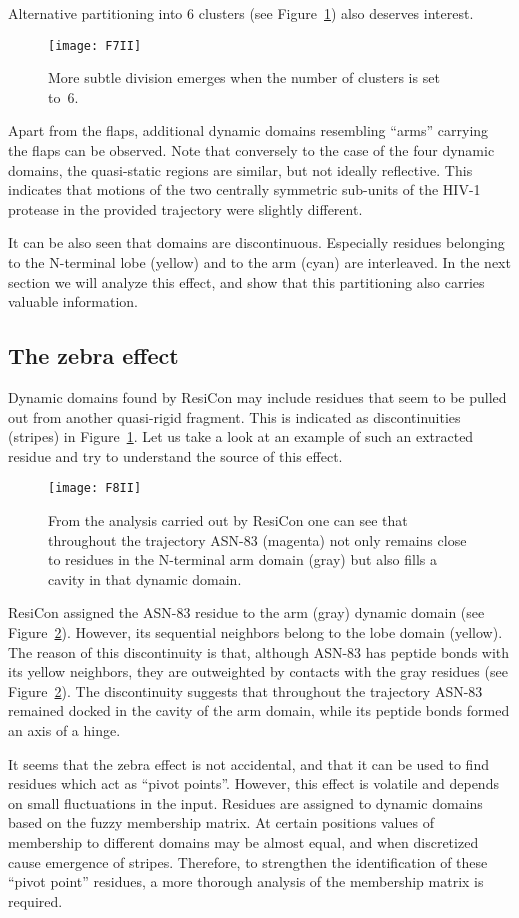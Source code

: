 \documentclass[a4paper,11pt,twoside]{book}%
\begin{document}
Alternative partitioning into 6 clusters (see Figure~\ref{6clusters}) also deserves interest.
\begin{figure}
\centering
\texttt{[image: F7II]}
\caption{
More subtle division emerges when the number of clusters is set to~6.
}
\label{6clusters}
\end{figure}
Apart from the flaps, additional dynamic domains resembling ``arms'' carrying the flaps can be observed.
Note that conversely to the case of the four dynamic domains, the quasi-static regions are similar, but not ideally reflective.
This indicates that motions of the two centrally symmetric sub-units of the HIV-1 protease in the provided trajectory were slightly different.

It can be also seen that domains are discontinuous.
Especially residues belonging to the N-terminal lobe (yellow) and to the arm (cyan) are interleaved.
In the next section we will analyze this effect, and show that this partitioning also carries valuable information.

\subsection*{The zebra effect}
Dynamic domains found by ResiCon may include residues that seem to be pulled out from another quasi-rigid fragment.
This is indicated as discontinuities (stripes) in Figure~\ref{6clusters}.
Let us take a look at an example of such an extracted residue and try to understand the source of this effect.
\begin{figure}
\centering
\texttt{[image: F8II]}
\caption{
From the analysis carried out by ResiCon one can see that throughout the trajectory ASN-83 (magenta) not only remains close to residues in the N-terminal arm domain (gray) but also fills a cavity in that dynamic domain.
}
\label{eradicated}
\end{figure}
ResiCon assigned the ASN-83 residue to the arm (gray) dynamic domain (see Figure~\ref{eradicated}).
However, its sequential neighbors belong to the lobe domain (yellow).
The reason of this discontinuity is that, although ASN-83 has peptide bonds with its yellow neighbors, they are outweighted by contacts with the gray residues (see Figure~\ref{eradicated}).
The discontinuity suggests that throughout the trajectory ASN-83 remained docked in the cavity of the arm domain, while its peptide bonds formed an axis of a hinge.

It seems that the zebra effect is not accidental, and that it can be used to find residues which act as ``pivot points''. 
However, this effect is volatile and depends on small fluctuations in the input.
Residues are assigned to dynamic domains based on the fuzzy membership matrix.
At certain positions values of membership to different domains may be almost equal, and when discretized cause emergence of stripes.
Therefore, to strengthen the identification of these ``pivot point'' residues, a more thorough analysis of the membership matrix is required.
\end{document}
